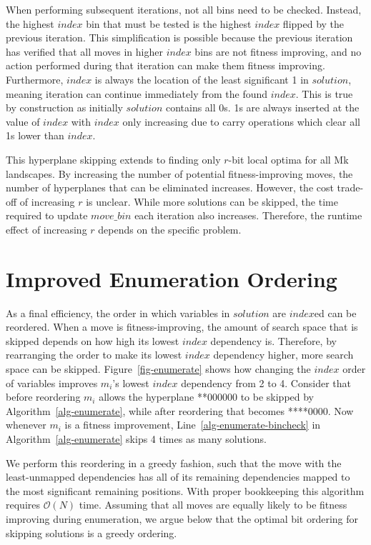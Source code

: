 \documentclass[runningheads,a4paper]{llncs}
\newcommand{\BigO}[1]{$\mathcal{O}{(#1)}$}
\begin{document}
When performing subsequent iterations, not all bins need to be checked. Instead, the highest $index$
bin that must be tested is the highest $index$ flipped by the previous iteration. This
simplification is possible because
the previous iteration has verified that all moves in higher $index$ bins are not fitness improving, and no action performed during
that iteration can make them fitness improving.
Furthermore, $index$ is always the location of the least significant 1 in $solution$, meaning
iteration can continue immediately from the found $index$. This is true by construction
as initially $solution$ contains all 0s. 1s are always inserted at the value of $index$
with $index$ only increasing due to carry operations which clear all 1s lower than $index$.

This hyperplane skipping extends to finding only $r$-bit local optima for all Mk landscapes.
By increasing the number of potential fitness-improving moves, the number of hyperplanes that
can be eliminated increases. However, the cost trade-off of increasing $r$ is unclear.
While more solutions can be skipped, the time required to update $move\_bin$ each iteration
also increases. Therefore, the runtime effect of increasing $r$
depends on the specific problem.

\section{Improved Enumeration Ordering}
\label{sec-reorder}
As a final efficiency, the order in which variables in $solution$ are $index$ed can be reordered.
When a move is fitness-improving,
the amount of search space that is skipped depends on how high its lowest $index$ dependency is. Therefore,
by rearranging the order to make its lowest $index$ dependency higher, more search space can be skipped. 
Figure~\ref{fig-enumerate} shows how changing the $index$ order of variables
improves $m_i$'s lowest $index$ dependency from 2 to 4. Consider that before reordering $m_i$ allows the hyperplane
**000000 to be skipped by Algorithm~\ref{alg-enumerate}, while after reordering that becomes ****0000.
Now whenever $m_i$ is a fitness improvement, Line~\ref{alg-enumerate-bincheck} in Algorithm~\ref{alg-enumerate}
skips 4 times as many solutions.

We perform this reordering in a greedy fashion, such that the move with the
least-unmapped dependencies has all of its remaining dependencies mapped to the
most significant remaining positions. With proper bookkeeping this algorithm requires
\BigO{N} time. Assuming that all moves are equally likely to be fitness improving
during enumeration, we argue below that the optimal bit ordering for skipping solutions is a greedy
ordering.
\end{document}
